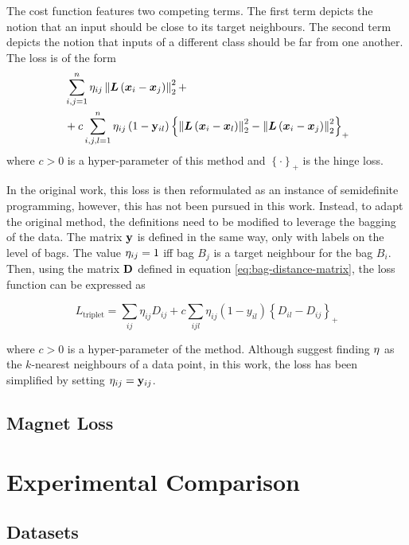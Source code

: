 The cost function features two competing terms. The first term depicts the notion that an input should be close to its target neighbours. The second term depicts the notion that inputs of a different class should be far from one another. The loss is of the form
\begin{align*}
	&\sum_{i, j = 1}^n \mathbf{\eta}_{ij} \left\lVert \bm{L} \left( \bm{x}_i - \bm{x}_j \right) \right\rVert_2^2 + \\
	&+ c \sum_{i, j, l = 1}^n \mathbf{\eta}_{ij} \left( 1 - \mathbf{y}_{il} \right) \left\{ \left\lVert \bm{L} \left( \bm{x}_i - \bm{x}_l \right) \right\rVert_2^2 - \left\lVert \bm{L} \left( \bm{x}_i - \bm{x}_j \right) \right\rVert_2^2 \right\}_+
\end{align*}
where \( c > 0 \) is a hyper-parameter of this method and \( \left\{ \cdot \right\}_+ \) is the hinge loss.

In the original work, this loss is then reformulated as an instance of semidefinite programming, however, this has not been pursued in this work. Instead, to adapt the original method, the definitions need to be modified to leverage the bagging of the data. The matrix \( \mathbf{y} \) is defined in the same way, only with labels on the level of bags. The value \( \mathbf{\eta}_{ij} = 1 \) iff bag \( B_j \) is a target neighbour for the bag \( B_i \). Then, using the matrix \( \mathbf{D} \) defined in equation \ref{eq:bag-distance-matrix}, the loss function can be expressed as

\[ L_\mathrm{triplet} = \sum_{ij} \eta_{ij} D_{ij} + c \sum_{ijl} \eta_{ij} \left( 1 - y_{il} \right) \left\{ D_{il} - D_{ij} \right\}_+ \]

where \( c > 0 \) is a hyper-parameter of the method. Although \cite{weinberger_distance_2006} suggest finding \( \mathbf{\eta} \) as the \( k \)-nearest neighbours of a data point, in this work, the loss has been simplified by setting \( \mathbf{\eta}_{ij} = \mathbf{y}_{ij} \).

\subsection{Magnet Loss}

\section{Experimental Comparison}\label{sec:experimental-comparison}


\subsection{Datasets}


